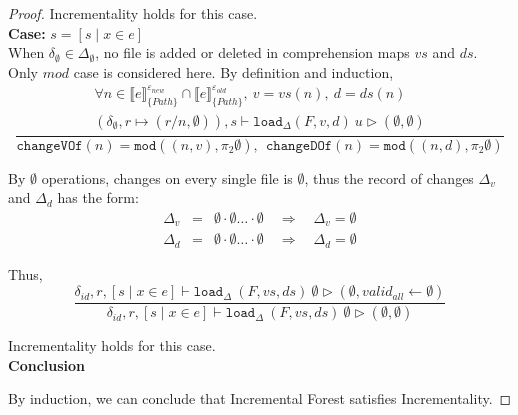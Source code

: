 \documentclass[10pt,twoside,a4paper]{article}
\theoremstyle{theorem}
\theoremstyle{lemma}
\theoremstyle{property}
\theoremstyle{definition}
\theoremstyle{assumption}
\def\snd{\pi_2}
\begin{document}
\begin{proof}
	Incrementality holds for this case.\\

	\textbf{Case: } $s = [ s \mid x \in e]$\\

	When $\delta_{\emptyset} \in \Delta_{\emptyset}$, no file is added or deleted in comprehension maps $vs$ and $ds$. Only $mod$ case is considered here. By definition and induction,
	\begin{displaymath}
		\frac{\begin{array}{c}
		\forall n \in \llbracket e \rrbracket^{\varepsilon_{new}}_{\{Path\}} \cap \llbracket e \rrbracket^{\varepsilon_{old}}_{\{Path\}}, ~ v = vs(n), ~d = ds(n)\\
		(\delta_{\emptyset}, r \mapsto (r/n, \emptyset)), s \vdash \mathtt{load}_\Delta (F,v,d)~ u \rhd (\emptyset,\emptyset)
		\end{array}}
		{\mathtt{changeVOf}(n) = \mathtt{mod}((n,v), \snd\emptyset), ~~\mathtt{changeDOf}(n) = \mathtt{mod}((n,d), \snd\emptyset)}
	\end{displaymath}

	By $\emptyset$ operations, changes on every single file is $\emptyset$, thus the record of changes $\Delta_v$ and $\Delta_d$ has the form:
	\begin{eqnarray*}
		\Delta_v &=& \emptyset \cdot \emptyset \dots \cdot \emptyset \quad \Rightarrow \quad \Delta_v = \emptyset\\
		\Delta_d &=& \emptyset \cdot \emptyset \dots \cdot \emptyset \quad \Rightarrow \quad \Delta_d = \emptyset
	\end{eqnarray*}

	Thus,
	\begin{displaymath}
	\frac
	{\delta_{id}, r, [ s \mid x \in e] \vdash \mathtt{load}_\Delta~ (F,vs,ds)~ \emptyset \rhd (\emptyset, valid_{all} \leftarrow \emptyset)}
	{\delta_{id}, r, [ s \mid x \in e] \vdash \mathtt{load}_\Delta~ (F,vs,ds)~ \emptyset \rhd (\emptyset, \emptyset)}
	\end{displaymath}

	Incrementality holds for this case.\\

	\textbf{Conclusion}

	By induction, we can conclude that Incremental Forest satisfies Incrementality.
\end{proof}
\end{document}
